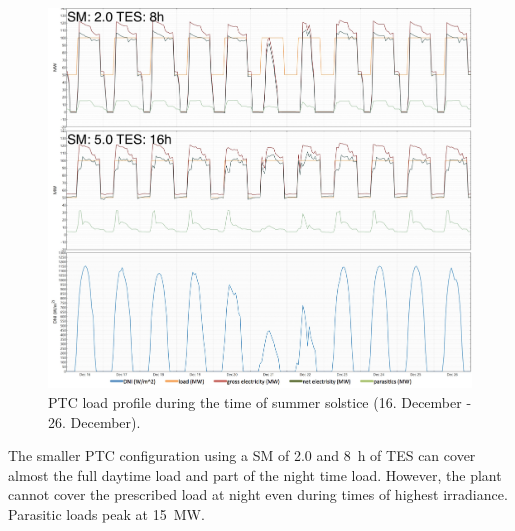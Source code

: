 \begin{figure}[htbp]  
\centering
\includegraphics[width=1\linewidth]{FIG/PTC_summer_load}
\caption[PTC load profile during the time of summer solstice.]{PTC load profile during the time of summer solstice (16. December - 26. December).}\label{PTC_summer_load}
\end{figure}

The smaller PTC configuration using a SM of \num{2.0} and \SI{8}{h} of TES can cover almost the full daytime load and part of the night time load. However, the plant cannot cover the prescribed load at night even during times of highest irradiance. Parasitic loads peak at \SI{15}{MW}. 


